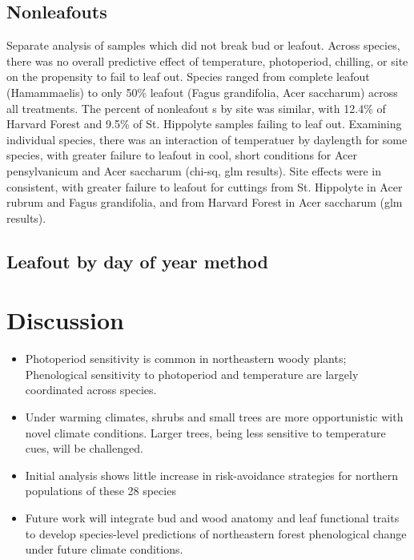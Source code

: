 \documentclass[11pt]{article}
\begin{document}
\subsection{Nonleafouts}

Separate analysis of samples which did not break bud or leafout. Across species, there was no overall predictive effect of temperature, photoperiod, chilling, or site on the propensity to fail to leaf out. 
Species ranged from complete leafout (Hamammaelis) to only 50\% leafout (Fagus grandifolia, Acer saccharum) across all treatments. The percent of nonleafout s by site was similar, with 12.4\% of Harvard Forest and 9.5\% of St. Hippolyte samples failing to leaf out. Examining individual species,  there was an interaction of temperatuer by daylength for some species, with greater failure to leafout in cool, short conditions for Acer pensylvanicum  and Acer saccharum (chi-sq, glm results). Site effects were in consistent, with greater failure to leafout for cuttings from St. Hippolyte in Acer rubrum and Fagus grandifolia, and from Harvard Forest in Acer saccharum (glm results).
 
\subsection{Leafout by day of year method}


 

\section{Discussion}

\begin{itemize}

\item{Photoperiod sensitivity is common in northeastern woody plants; Phenological sensitivity to photoperiod and temperature are largely coordinated across species.}
\item{Under warming climates, shrubs and small trees are more opportunistic with novel climate conditions. Larger trees, being less sensitive to temperature cues, will be challenged. }
\item{Initial analysis shows little increase in risk-avoidance strategies for northern populations of these 28 species}
\item{Future work will integrate bud and wood anatomy and leaf functional traits to develop species-level predictions of northeastern forest phenological change under future climate conditions.}
\end{itemize}
\end{document}
